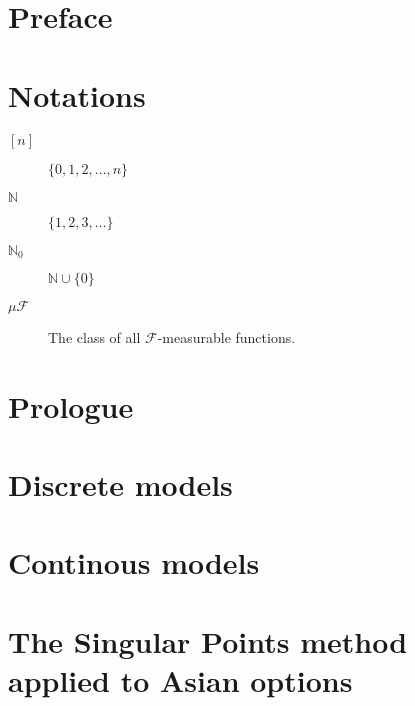 \documentclass[12pt,a4paper,oneside]{amsbook}
\begin{document}
\frontmatter







\tableofcontents



\chapter*{Preface}
\label{cha:preface}



\chapter*{Notations}
\begin{description}
	\item[$ {[n]} $] $ \{0, 1, 2, \dots, n\} $
	\item[$ \mathbb{N} $] $ \{ 1, 2, 3, \dots \} $
	\item[$ \mathbb{N}_0 $] $ \mathbb{N} \cup \{ 0 \} $
	\item[$ \mu \mathcal{F} $] The class of all $ \mathcal{F} $-measurable functions.
\end{description}


\mainmatter

\chapter{Prologue}
\label{cha:prologue}


\chapter{Discrete models}
\label{cha:discrete}


\chapter{Continous models}
\label{cha:continous}


\chapter[Asian options]{The Singular Points method applied to Asian options}
\label{cha:sp-asian}

\end{document}
